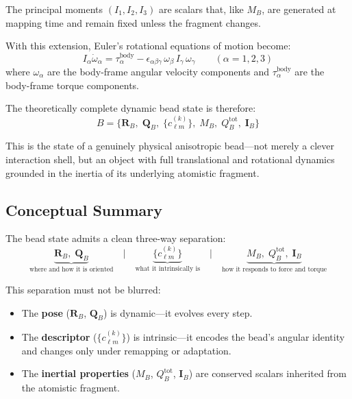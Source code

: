 \documentclass[11pt]{article}
\begin{document}
The principal moments $(I_1, I_2, I_3)$ are scalars that, like $M_B$,
are generated at mapping time and remain fixed unless the fragment changes.

With this extension, Euler's rotational equations of motion become:
\begin{equation}
    I_\alpha \dot{\omega}_\alpha
    = \tau_\alpha^{\mathrm{body}}
    - \epsilon_{\alpha\beta\gamma}\, \omega_\beta\, I_\gamma\, \omega_\gamma
    \qquad (\alpha = 1,2,3)
\end{equation}
where $\omega_\alpha$ are the body-frame angular velocity components and
$\tau_\alpha^{\mathrm{body}}$ are the body-frame torque components.

The theoretically complete dynamic bead state is therefore:
\begin{equation}
\boxed{
    B = \bigl\{
        \mathbf{R}_B,\;
        \mathbf{Q}_B,\;
        \{c_{\ell m}^{(k)}\},\;
        M_B,\;
        Q_B^{\mathrm{tot}},\;
        \mathbf{I}_B
    \bigr\}
}
\end{equation}

This is the state of a genuinely physical anisotropic bead---not merely a
clever interaction shell, but an object with full translational and
rotational dynamics grounded in the inertia of its underlying atomistic
fragment.

\subsection{Conceptual Summary}

The bead state admits a clean three-way separation:
\begin{equation}
    \underbrace{\mathbf{R}_B,\; \mathbf{Q}_B}_{\text{where and how it is oriented}}
    \quad\Big|\quad
    \underbrace{\{c_{\ell m}^{(k)}\}}_{\text{what it intrinsically is}}
    \quad\Big|\quad
    \underbrace{M_B,\; Q_B^{\mathrm{tot}},\; \mathbf{I}_B}_{\text{how it responds to force and torque}}
\end{equation}

\noindent
This separation must not be blurred:
\begin{itemize}
    \item The \textbf{pose} ($\mathbf{R}_B$, $\mathbf{Q}_B$) is dynamic---it
          evolves every step.
    \item The \textbf{descriptor} ($\{c_{\ell m}^{(k)}\}$) is intrinsic---it
          encodes the bead's angular identity and changes only under
          remapping or adaptation.
    \item The \textbf{inertial properties} ($M_B$, $Q_B^{\mathrm{tot}}$,
          $\mathbf{I}_B$) are conserved scalars inherited from the atomistic
          fragment.
\end{itemize}
\end{document}
